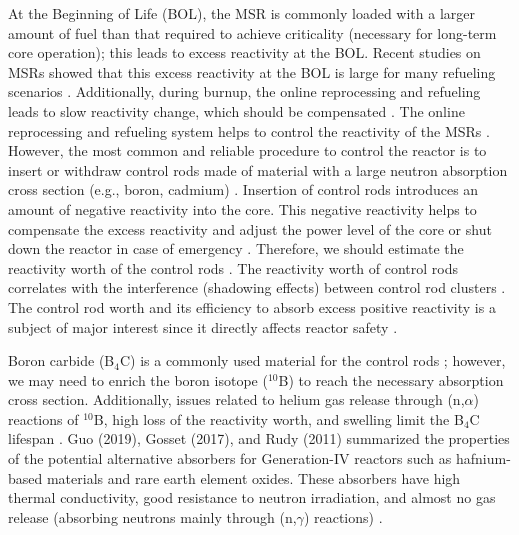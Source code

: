 At the Beginning of Life (BOL), the MSR is commonly loaded with a larger amount of 
fuel than that required to achieve criticality (necessary for long-term core 
operation); this leads to excess reactivity at the BOL. Recent studies on MSRs showed that this excess reactivity 
at the BOL is large for many refueling scenarios 
\cite{ashraf2020Strategies,ashraf2020whole,rykhlevskii2019modeling,betzler2016modeling,ashraf2018nuclear,ashraf2019modeling}.
Additionally, during burnup, the online 
reprocessing and refueling leads to slow reactivity change, which 
should be compensated \cite{ashraf2020Strategies,ashraf2020whole}. 
The online reprocessing and refueling system helps to control the reactivity of 
the MSRs \cite{ashraf2020whole,ashraf2019Preliminary}. However, the most common and reliable procedure 
to control the reactor is to insert or withdraw control rods made of material 
with a large neutron absorption cross section (e.g., boron, cadmium) 
\cite{duderstadt650nuclear}. 
Insertion of control rods introduces an amount of negative reactivity into the 
core. This negative reactivity helps to compensate the excess reactivity and 
adjust the power level of the core or shut down the reactor in case of 
emergency \cite{glasstone1967nuclear}. Therefore, we should estimate 
the reactivity worth of the control rods 
\cite{varvayanni2009estimation,fadaei2009control,aoyama2007core,bretscher1997computing}.
 The reactivity worth of control rods correlates with the interference 
(shadowing effects) between control rod clusters 
\cite{girardin2008development,vcerba2017optimization}. 
The control rod worth and its efficiency to absorb excess positive reactivity is a subject of major interest since it directly affects reactor safety \cite{liu2018criticality,atkinson2019small,vcerba2017optimization,do2019criticality,guo2019advanced,varvayanni2009estimation}.

Boron carbide (B$_4$C) is a commonly used material for the control rods 
\cite{zhong2019preliminary,steinbruck2010degradation,dunner1984absorber}; 
however, we may need to enrich the boron isotope ($^{10}$B) to reach 
the necessary absorption cross section. Additionally, issues related to helium gas release through (n,$\alpha$) reactions of $^{10}$B, high loss of the reactivity worth, and swelling limit the B$_4$C lifespan 
\cite{guo2019optimized}. Guo (2019), Gosset (2017), and Rudy (2011) summarized the properties of the 
potential alternative absorbers for Generation-IV reactors such as 
hafnium-based materials and rare earth element oxides. These absorbers have 
high thermal conductivity, good resistance to neutron irradiation, and
almost no gas release (absorbing neutrons mainly through (n,$\gamma$) reactions)
\cite{guo2019optimized,gosset2017absorber,konings2011comprehensive}.


